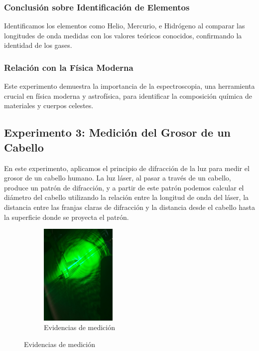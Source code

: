 \subsubsection{Conclusión sobre Identificación de Elementos}
Identificamos los elementos como Helio, Mercurio, e Hidrógeno al comparar las longitudes de onda medidas con los valores teóricos conocidos, confirmando la identidad de los gases.

\subsubsection{Relación con la Física Moderna}
Este experimento demuestra la importancia de la espectroscopia, una herramienta crucial en física moderna y astrofísica, para identificar la composición química de materiales y cuerpos celestes.

\subsection{Experimento 3: Medición del Grosor de un Cabello}
En este experimento, aplicamos el principio de difracción de la luz para medir el grosor de un cabello humano. La luz láser, al pasar a través de un cabello, produce un patrón de difracción, y a partir de este patrón podemos calcular el diámetro del cabello utilizando la relación entre la longitud de onda del láser, la distancia entre las franjas claras de difracción y la distancia desde el cabello hasta la superficie donde se proyecta el patrón.

\begin{figure}[H]
  \centering
  \begin{subfigure}[b]{\textwidth}
      \centering
      \includegraphics[width=0.4\textwidth]{Figures/1. Content/experimento-3.jpeg}
      \caption{Evidencias de medición}
      \label{fig: Evidencias de medicion 3}
  \end{subfigure}
  \hfill
\end{figure}

